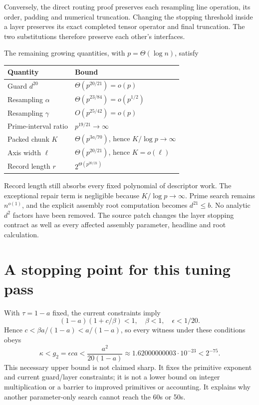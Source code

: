 \documentclass[11pt]{article}
\begin{document}
Conversely, the direct routing proof preserves each resampling line operation,
its order, padding and numerical truncation. Changing the stopping threshold
inside a layer preserves its exact completed tensor operator and final
truncation. The two substitutions therefore preserve each other's interfaces.

The remaining growing quantities, with $p=\Theta(\log n)$, satisfy
\begin{center}
\begin{tabular}{ll}
\toprule
Quantity & Bound\\
\midrule
Guard $d^{20}$ & $\Theta(p^{20/21})=o(p)$\\
Resampling $\alpha$ & $\Theta(p^{23/84})=o(p^{1/2})$\\
Resampling $\gamma$ & $O(p^{25/42})=o(p)$\\
Prime-interval ratio & $p^{19/21}\to\infty$\\
Packed chunk $K$ & $\Theta(p^{3a/70})$, hence $K/\log p\to\infty$\\
Axis width $\ell$ & $\Theta(p^{20/21})$, hence $K=o(\ell)$\\
Record length $r$ & $2^{\Theta(p^{20/21})}$\\
\bottomrule
\end{tabular}
\end{center}
Record length still absorbs every fixed polynomial of descriptor work.
The exceptional repair term is negligible because $K/\log p\to\infty$.
Prime search remains $n^{o(1)}$, and the explicit assembly root computation
becomes $d^{21}\le b$. No analytic $d^2$ factors have been removed.
The source patch changes the layer stopping contract as well as every affected
assembly parameter, headline and root calculation.

\section{A stopping point for this tuning pass}
With $\tau=1-a$ fixed, the current constraints imply
\[
 (1-a)(1+c/\beta)<1,\quad \beta<1,\quad \epsilon<1/20.
\]
Hence $c<\beta a/(1-a)<a/(1-a)$, so every witness under these conditions obeys
\[
 \kappa<g_2=\epsilon ca<\frac{a^2}{20(1-a)}
 \approx1.62000000003\cdot10^{-23}<2^{-75}.
\]
This necessary upper bound is not claimed sharp. It fixes the primitive
exponent and current guard/layer constraints; it is not a lower bound on
integer multiplication or a barrier to improved primitives or accounting.
It explains why another parameter-only search cannot reach the 60s or 50s.
\end{document}

